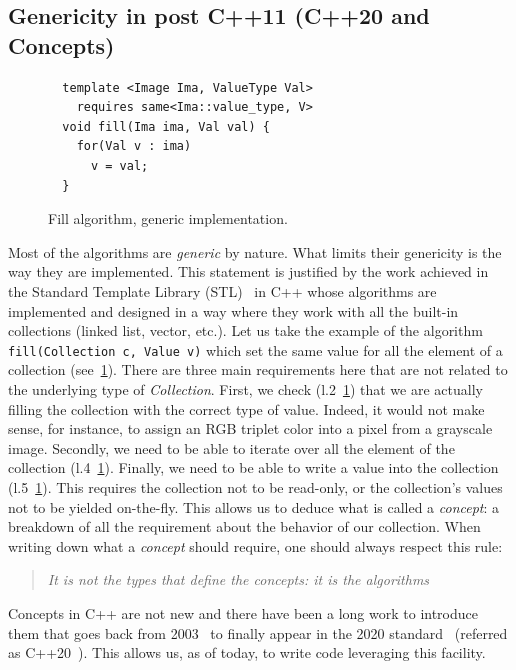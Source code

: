\subsection{Genericity in post C++11 (C++20 and Concepts)}
\label{sec:postcpp11}

\begin{figure}[htbp]
  \centering
  \begin{verbatim}
  template <Image Ima, ValueType Val>
    requires same<Ima::value_type, V>
  void fill(Ima ima, Val val) {
    for(Val v : ima)
      v = val;
  }
  \end{verbatim}

  \caption{Fill algorithm, generic implementation.}
  \label{code:gen.fill}
\end{figure}

Most of the algorithms are \emph{generic} by nature. What limits their genericity is the way they are implemented. This
statement is justified by the work achieved in the Standard Template Library (STL)~\parencite{dehnert.1998.fundamentals}
in C++ whose algorithms are implemented and designed in a way where they work with all the built-in collections (linked
list, vector, etc.). Let us take the example of the algorithm \texttt{fill(Collection c, Value v)} which set the same
value for all the element of a collection (see~\cref{code:gen.fill}). There are three main requirements here that are not
related to the underlying type of \emph{Collection}. First, we check (l.2~\ref{code:gen.fill}) that we are actually
filling the collection with the correct type of value. Indeed, it would not make sense, for instance, to assign an RGB
triplet color into a pixel from a grayscale image. Secondly, we need to be able to iterate over all the element of the
collection (l.4~\ref{code:gen.fill}). Finally, we need to be able to write a value into the collection
(l.5~\ref{code:gen.fill}). This requires the collection not to be read-only, or the collection's values not to be yielded
on-the-fly. This allows us to deduce what is called a \emph{concept}: a breakdown of all the requirement about the
behavior of our collection. When writing down what a \emph{concept} should require, one should always respect this rule:
\blockquote{\emph{It is not the types that define the concepts: it is the algorithms}}. Concepts in C++ are not new and
there have been a long work to introduce them that goes back from
2003~\parencite{seymour.2009.concepts,stroustrup.2003.concepts,sutton.2017.concepts} to finally appear in the 2020
standard~\cite{voutilainen.2017.concepts} (referred as C++20~\parencite{iso.2011.cpp}). This allows us, as of today, to
write code leveraging this facility.

